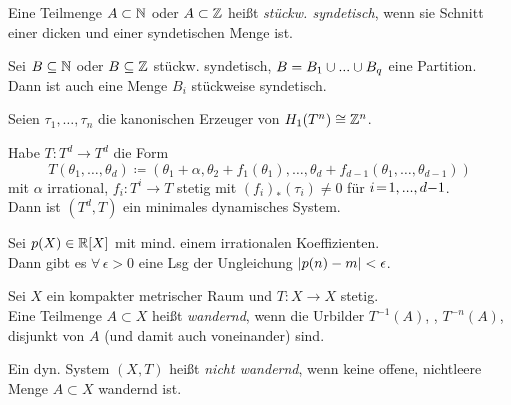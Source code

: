 \documentclass{cheat-sheet}
\begin{document}
\begin{defn}
  Eine Teilmenge $A \subset \mathbb{N}$ oder $A \subset \mathbb{Z}$ heißt \emph{stückw. syndetisch}, wenn sie Schnitt einer dicken und einer syndetischen Menge ist.
\end{defn}


\begin{thm}
  Sei $B \subseteq \mathbb{N}$ oder $B \subseteq \mathbb{Z}$ stückw. syndetisch, $B = B_1 \cup ... \cup B_q$ eine Partition.
  Dann ist auch eine Menge $B_i$ stückweise syndetisch.
\end{thm}


\begin{bem}
  Seien $\tau_1, \ldots, \tau_n$ die kanonischen Erzeuger von $H_1(T^n) \cong \mathbb{Z}^n$.
\end{bem}

\begin{lem}
  Habe $T : T^d \to T^d$ die Form
  \[
    T(\theta_1, \ldots, \theta_d) \coloneqq
    (\theta_1 + \alpha, \theta_2 + f_1(\theta_1), \ldots, \theta_d + f_{d-1}(\theta_1, \ldots, \theta_{d-1}))
  \]
  mit $\alpha$ irrational, $f_i : T^i \!\to\! T$ stetig mit $(f_i)_*(\tau_i) \!\neq\! 0$ für $i \!=\! 1, ..., d{-}1$. \\
  Dann ist $(T^d, T)$ ein minimales dynamisches System.
\end{lem}

\begin{thm}
  Sei $p(X) \in \mathbb{R}[X]$ mit mind. einem irrationalen Koeffizienten. \\
  Dann gibt es $\forall \, \epsilon > 0$ eine Lsg der Ungleichung $\lvert p(n) - m\rvert < \epsilon$.
\end{thm}


\begin{defn}
  Sei $X$ ein kompakter metrischer Raum und $T : X \to X$ stetig. \\
  Eine Teilmenge $A \subset X$ heißt \emph{wandernd}, wenn die Urbilder $T^{-1}(A)$, \nldots{}, $T^{-n}(A)$, \nldots{} disjunkt von $A$ (und damit auch voneinander) sind.
\end{defn}

\begin{defn}
  Ein dyn. System $(X, T)$ heißt \emph{nicht wandernd}, wenn keine offene, nichtleere Menge $A \subset X$ wandernd ist.
\end{defn}
\end{document}
